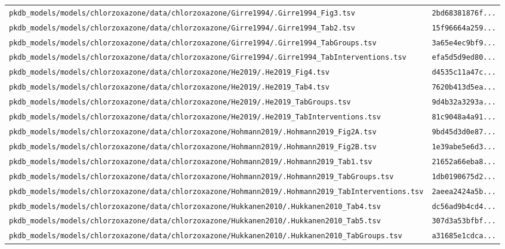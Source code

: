 \documentclass{article}
\begin{document}
\begin{longtable}{ll}
\texttt{pkdb\_models/models/chlorzoxazone/data/chlorzoxazone/Girre1994/.Girre1994\_Fig3.tsv} & \texttt{2bd68381876f...} \\
\texttt{pkdb\_models/models/chlorzoxazone/data/chlorzoxazone/Girre1994/.Girre1994\_Tab2.tsv} & \texttt{15f96664a259...} \\
\texttt{pkdb\_models/models/chlorzoxazone/data/chlorzoxazone/Girre1994/.Girre1994\_TabGroups.tsv} & \texttt{3a65e4ec9bf9...} \\
\texttt{pkdb\_models/models/chlorzoxazone/data/chlorzoxazone/Girre1994/.Girre1994\_TabInterventions.tsv} & \texttt{efa5d5d9ed80...} \\
\texttt{pkdb\_models/models/chlorzoxazone/data/chlorzoxazone/He2019/.He2019\_Fig4.tsv} & \texttt{d4535c11a47c...} \\
\texttt{pkdb\_models/models/chlorzoxazone/data/chlorzoxazone/He2019/.He2019\_Tab4.tsv} & \texttt{7620b413d5ea...} \\
\texttt{pkdb\_models/models/chlorzoxazone/data/chlorzoxazone/He2019/.He2019\_TabGroups.tsv} & \texttt{9d4b32a3293a...} \\
\texttt{pkdb\_models/models/chlorzoxazone/data/chlorzoxazone/He2019/.He2019\_TabInterventions.tsv} & \texttt{81c9048a4a91...} \\
\texttt{pkdb\_models/models/chlorzoxazone/data/chlorzoxazone/Hohmann2019/.Hohmann2019\_Fig2A.tsv} & \texttt{9bd45d3d0e87...} \\
\texttt{pkdb\_models/models/chlorzoxazone/data/chlorzoxazone/Hohmann2019/.Hohmann2019\_Fig2B.tsv} & \texttt{1e39abe5e6d3...} \\
\texttt{pkdb\_models/models/chlorzoxazone/data/chlorzoxazone/Hohmann2019/.Hohmann2019\_Tab1.tsv} & \texttt{21652a66eba8...} \\
\texttt{pkdb\_models/models/chlorzoxazone/data/chlorzoxazone/Hohmann2019/.Hohmann2019\_TabGroups.tsv} & \texttt{1db0190675d2...} \\
\texttt{pkdb\_models/models/chlorzoxazone/data/chlorzoxazone/Hohmann2019/.Hohmann2019\_TabInterventions.tsv} & \texttt{2aeea2424a5b...} \\
\texttt{pkdb\_models/models/chlorzoxazone/data/chlorzoxazone/Hukkanen2010/.Hukkanen2010\_Tab4.tsv} & \texttt{dc56ad9b4cd4...} \\
\texttt{pkdb\_models/models/chlorzoxazone/data/chlorzoxazone/Hukkanen2010/.Hukkanen2010\_Tab5.tsv} & \texttt{307d3a53bfbf...} \\
\texttt{pkdb\_models/models/chlorzoxazone/data/chlorzoxazone/Hukkanen2010/.Hukkanen2010\_TabGroups.tsv} & \texttt{a31685e1cdca...} \\

\end{longtable}
\end{document}
